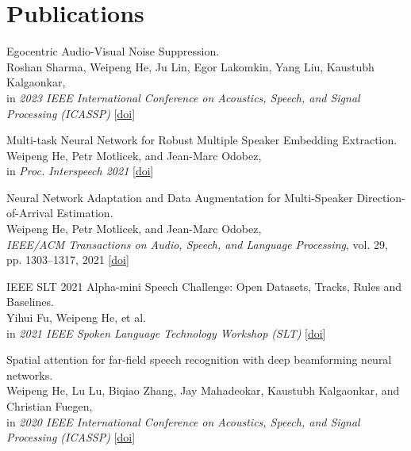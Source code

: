 \documentclass[a4paper,9pt]{extarticle} %
\begin{document}
\section{Publications}
\begin{enumerate}[label={[\arabic*]}]
  \item Egocentric Audio-Visual Noise Suppression. \\
        Roshan Sharma, Weipeng He, Ju Lin, Egor Lakomkin, Yang Liu, Kaustubh Kalgaonkar, \\
        in \textit{2023 IEEE International Conference on Acoustics, Speech, and Signal Processing (ICASSP)}
        [\href{https://doi.org/10.1109/ICASSP49357.2023.10095890}{doi}]

  \item Multi-task Neural Network for Robust Multiple Speaker Embedding Extraction. \\
        Weipeng He, Petr Motlicek, and Jean-Marc Odobez, \\
        in \textit{Proc. Interspeech 2021}
        [\href{https://doi.org/10.21437/Interspeech.2021-1769}{doi}]

  \item Neural Network Adaptation and Data Augmentation for Multi-Speaker Direction-of-Arrival Estimation. \\
        Weipeng He, Petr Motlicek, and Jean-Marc Odobez, \\
        \textit{IEEE/ACM Transactions on Audio, Speech, and Language Processing}, vol. 29, pp. 1303–1317, 2021
        [\href{https://doi.org/10.1109/TASLP.2021.3060257}{doi}]

  \item IEEE SLT 2021 Alpha-mini Speech Challenge: Open Datasets, Tracks, Rules and Baselines. \\
        Yihui Fu, Weipeng He, et al. \\
        in \textit{2021 IEEE Spoken Language Technology Workshop (SLT)}
        [\href{https://doi.org/10.1109/SLT48900.2021.9383546}{doi}]

  \item Spatial attention for far-field speech recognition with deep beamforming neural networks. \\
        Weipeng He, Lu Lu, Biqiao Zhang, Jay Mahadeokar, Kaustubh Kalgaonkar, and Christian Fuegen, \\
        in \textit{2020 IEEE International Conference on Acoustics, Speech, and Signal Processing (ICASSP)}
        [\href{https://doi.org/10.1109/ICASSP40776.2020.9053439}{doi}]


\end{enumerate}
\end{document}
